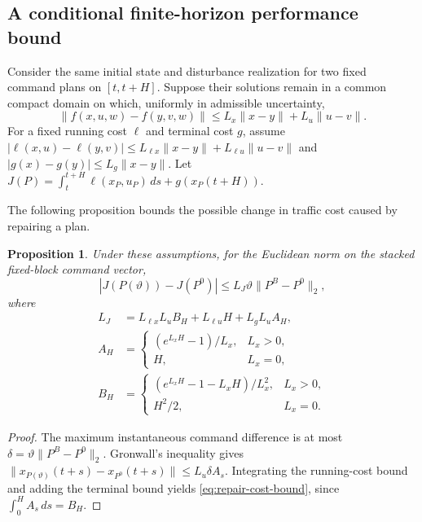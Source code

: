 \documentclass[journal,10pt]{IEEEtran}
\newtheorem{proposition}{Proposition}
\begin{document}
\subsection{A conditional finite-horizon performance bound}
Consider the same initial state and disturbance realization for two fixed
command plans on $[t,t+H]$. Suppose their solutions remain in a common
compact domain on which, uniformly in admissible uncertainty,
\[
\|f(x,u,w)-f(y,v,w)\|
\le L_x\|x-y\|+L_u\|u-v\|.
\]
For a fixed running cost $\ell$ and terminal cost $g$, assume
$|\ell(x,u)-\ell(y,v)|\le L_{\ell x}\|x-y\|+
L_{\ell u}\|u-v\|$ and $|g(x)-g(y)|\le L_g\|x-y\|$.
Let $J(P)=\int_t^{t+H}\ell(x_P,u_P)\,ds+g(x_P(t+H))$.

The following proposition bounds the possible change in traffic cost caused by repairing a plan.

\begin{proposition}
\label{prop:repair-cost}
Under these assumptions, for the Euclidean norm on the stacked fixed-block
command vector,
\begin{equation}
|J(P(\vartheta))-J(P^0)|
\le L_J\vartheta\|P^B-P^0\|_2,
\label{eq:repair-cost-bound}
\end{equation}
where
\begin{align*}
L_J&=L_{\ell x}L_u B_H+L_{\ell u}H+L_gL_u A_H,\\
A_H&=\begin{cases}(e^{L_xH}-1)/L_x,&L_x>0,\\H,&L_x=0,\end{cases}\\
B_H&=\begin{cases}(e^{L_xH}-1-L_xH)/L_x^2,&L_x>0,\\H^2/2,&L_x=0.\end{cases}
\end{align*}
\end{proposition}
\begin{proof}
The maximum instantaneous command difference is at most
$\delta=\vartheta\|P^B-P^0\|_2$. Gronwall's inequality gives
$\|x_{P(\vartheta)}(t+s)-x_{P^0}(t+s)\|\le L_u\delta A_s$.
Integrating the running-cost bound and adding the terminal bound yields
\eqref{eq:repair-cost-bound}, since $\int_0^H A_s\,ds=B_H$.
\end{proof}
\end{document}
